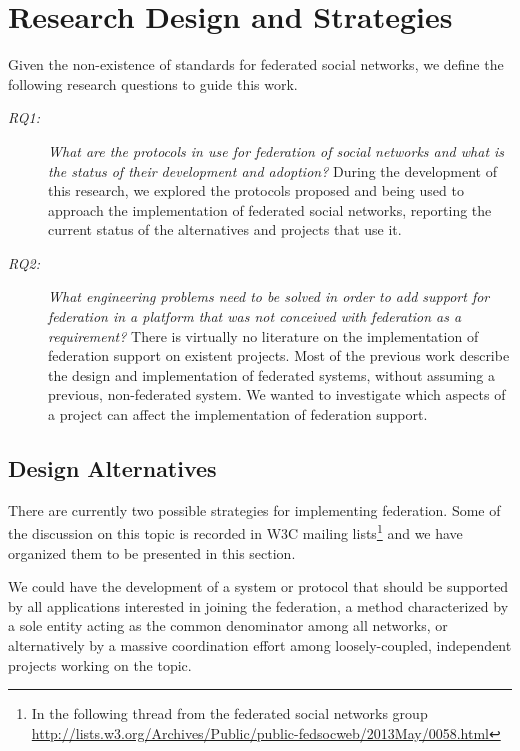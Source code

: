 \chapter{Research Design and Strategies}
\label{chapter:4}

Given the non-existence of standards for federated social networks, we define
the following research questions to guide this work.

\begin{description}
  \item [\textit{RQ1:}]
    \textit{What are the protocols in use for federation of social networks and
    what is the status of their development and adoption?}
    During the development of this research, we explored the protocols proposed
    and being used to approach the implementation of federated social networks,
    reporting the current status of the alternatives and projects that use it.

  \item [\textit{RQ2:}]
    \textit{What engineering problems need to be solved in order to add support for
    federation in a platform that was not conceived with federation as a
    requirement?}
    There is virtually no literature on the implementation of federation support on
    existent projects. Most of the previous work describe the design and
    implementation of federated systems, without assuming a previous, non-federated
    system. We wanted to investigate which aspects of a project can affect the
    implementation of federation support.
\end{description}

\section{Design Alternatives}

There are currently two possible strategies for implementing federation. Some
of the discussion on this topic is recorded in W3C mailing lists\footnote{In
the following thread from the federated social networks group
\url{http://lists.w3.org/Archives/Public/public-fedsocweb/2013May/0058.html}}
and we have organized them to be presented in this section.

We could have the development of a system or protocol that should
be supported by all applications interested in joining the federation, a
method characterized by a sole entity acting as the common denominator
among all networks, or alternatively by a massive coordination effort
among loosely-coupled, independent projects working on the topic.

